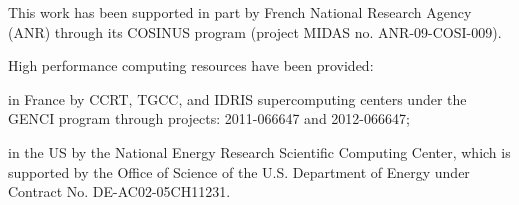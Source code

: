This work has been supported in part by French National Research Agency (A\-N\-R) through its C\-O\-S\-I\-N\-U\-S program (project M\-I\-D\-A\-S no. A\-N\-R-\/09-\/\-C\-O\-S\-I-\/009).



High performance computing resources have been provided\-:
\begin{DoxyItemize}
\item in France by C\-C\-R\-T, T\-G\-C\-C, and I\-D\-R\-I\-S supercomputing centers under the G\-E\-N\-C\-I program through projects\-: 2011-\/066647 and 2012-\/066647;
\item in the U\-S by the National Energy Research Scientific Computing Center, which is supported by the Office of Science of the U.\-S. Department of Energy under Contract No. D\-E-\/\-A\-C02-\/05\-C\-H11231. 
\end{DoxyItemize}